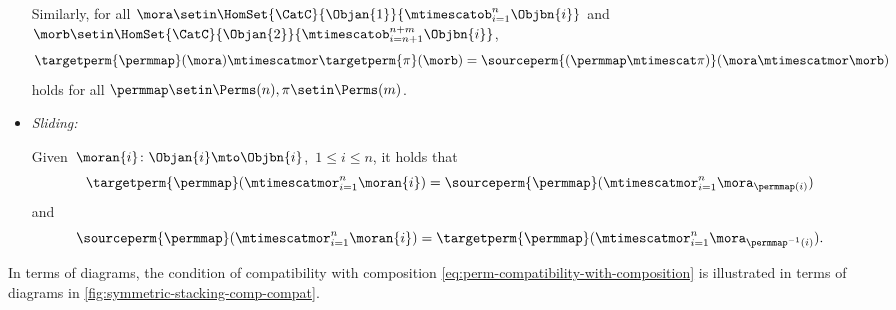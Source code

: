 \begin{ctdefinition}
\begin{itemize}
              Similarly, for all $\mora \setin\HomSet{\CatC}{\Objan{1}}{\mtimescatob_{i=1}^n \Objbn{i}} $ and $\morb \setin\HomSet{\CatC}{\Objan{2}}{\mtimescatob_{i=n+1}^{n+m} \Objbn{i}}$,
              \begin{equation}
                  \targetperm{\permmap}(\mora) \mtimescatmor \targetperm{\pi}(\morb) = \sourceperm{(\permmap \mtimescat \pi)}(\mora \mtimescatmor \morb)
              \end{equation}
              holds for all $\permmap \setin\Perms(n), \pi \setin\Perms(m)$.

        \item \emph{Sliding:}

              Given~$\moran{i} \colon \Objan{i} \mto \Objbn{i}$,~$1 \leq i \leq n$, it holds that
              \begin{equation}
                  \label{eq:perm-compatibility-with-stacking-1}
                  \targetperm{\permmap} ( \mtimescatmor_{i=1}^n \moran{i} ) = \sourceperm{\permmap}( \mtimescatmor_{i=1}^n \mora_{\permmap(i)} )
              \end{equation}
              and
              \begin{equation}
                  \label{eq:perm-compatibility-with-stacking-2}
                  \sourceperm{\permmap} ( \mtimescatmor_{i=1}^n \moran{i} ) = \targetperm{\permmap} ( \mtimescatmor_{i=1}^n \mora_{\permmap^{-1}(i)} ).
              \end{equation}

    \end{itemize}
\end{ctdefinition}




In terms of diagrams, the condition of compatibility with composition \cref{eq:perm-compatibility-with-composition} is illustrated in terms of diagrams in \cref{fig:symmetric-stacking-comp-compat}.

